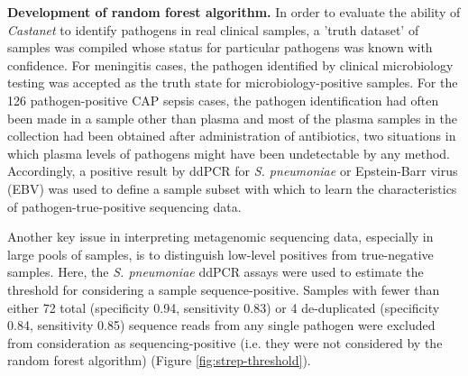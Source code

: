 \textbf{Development of random forest algorithm.}
In order to evaluate the ability of \textit{Castanet} to identify pathogens in real clinical samples, a 'truth dataset' of samples was compiled whose status for particular pathogens was known with confidence. For meningitis cases, the pathogen identified by clinical microbiology testing was accepted as the truth state for microbiology-positive samples. For the 126 pathogen-positive CAP sepsis cases, the pathogen identification had often been made in a sample other than plasma and most of the plasma samples in the collection had been obtained after administration of antibiotics, two situations in which plasma levels of pathogens might have been undetectable by any method. Accordingly, a positive result by ddPCR for \textit{S. pneumoniae} or Epstein-Barr virus (EBV) was used to define a sample subset with which to learn the characteristics of pathogen-true-positive sequencing data. 

Another key issue in interpreting metagenomic sequencing data, especially in large pools of samples, is to distinguish low-level positives from true-negative samples. Here, the \textit{S. pneumoniae} ddPCR assays were used to estimate the threshold for considering a sample sequence-positive. Samples with fewer than either 72 total (specificity 0.94, sensitivity 0.83) or 4 de-duplicated (specificity 0.84, sensitivity 0.85) sequence reads from any single pathogen were excluded from consideration as sequencing-positive (i.e. they were not considered by the random forest algorithm) (Figure \ref{fig:strep-threshold}).

